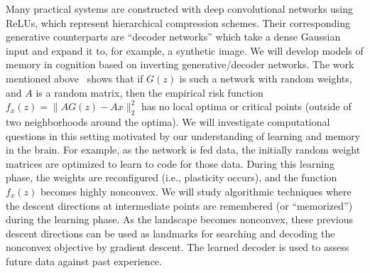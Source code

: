 Many practical systems are constructed with deep convolutional
networks using ReLUs, which represent hierarchical compression
schemes. Their corresponding generative counterparts are ``decoder
networks'' which take a dense Gaussian input and expand it to, for
example, a synthetic image. We will develop models of memory in
cognition based on inverting generative/decoder networks. The
work mentioned above~\citep{HandV17} shows that if $G(z)$ is such a
network with random weights, and $A$ is a random matrix, then the
empirical risk function $ f_x(z) = \|AG(z) - Ax\|_2^2$ has no local
optima or critical points (outside of two neighborhoods around the
optima). We will investigate computational questions in this setting
motivated by our understanding of learning and memory in
the brain. For example, as the network is fed data, the initially
random weight matrices are optimized to learn to code for those data.
During this learning phase, the weights are reconfigured (i.e., plasticity occurs),
and the function $f_x(z)$ becomes highly nonconvex. We will study
algorithmic techniques where the descent directions at intermediate
points are remembered (or ``memorized'') during the learning phase. As
the landscape becomes nonconvex, these previous descent
directions can be used as landmarks for searching and decoding the nonconvex
objective by gradient descent. The learned decoder is used to assess
future data against past experience.

